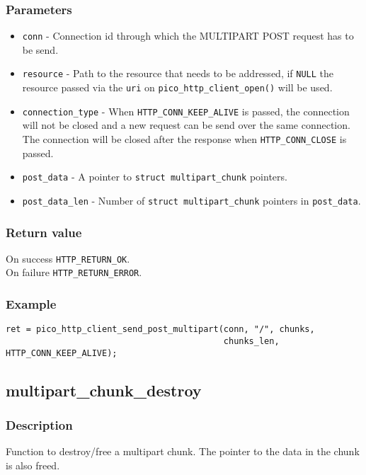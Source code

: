 \subsubsection*{Parameters}
\begin{itemize}[noitemsep]
\item \texttt{conn} - Connection id through which the MULTIPART POST request has to be send.
\item \texttt{resource} - Path to the resource that needs to be addressed, if \texttt{NULL} the resource passed via the \texttt{uri} on \texttt{pico\_http\_client\_open()} will be used.
\item \texttt{connection\_type} - When \texttt{HTTP\_CONN\_KEEP\_ALIVE} is passed, the connection will not be closed and a new request can be send over the same connection. The connection will be closed after the response when \texttt{HTTP\_CONN\_CLOSE} is passed.
\item \texttt{post\_data} - A pointer to \texttt{struct multipart\_chunk} pointers.
\item \texttt{post\_data\_len} - Number of \texttt{struct multipart\_chunk} pointers in \texttt{post\_data}.
\end{itemize}
\subsubsection*{Return value}
On success \texttt{HTTP\_RETURN\_OK}.
\\On failure \texttt{HTTP\_RETURN\_ERROR}.
\subsubsection*{Example}
\begin{verbatim}
ret = pico_http_client_send_post_multipart(conn, "/", chunks,
                                           chunks_len, HTTP_CONN_KEEP_ALIVE);
\end{verbatim}


\subsection{multipart\_chunk\_destroy}

\subsubsection*{Description}
Function to destroy/free a multipart chunk. The pointer to the data in the chunk is also freed.


